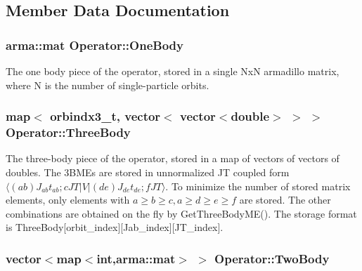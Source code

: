 \subsection{Member Data Documentation}
\hypertarget{classOperator_a14b1c78e0be45772aa57168c74d1b57c}{
\subsubsection[{One\-Body}]{\setlength{\rightskip}{0pt plus 5cm}arma\-::mat Operator\-::\-One\-Body}}\label{classOperator_a14b1c78e0be45772aa57168c74d1b57c}
The one body piece of the operator, stored in a single Nx\-N armadillo matrix, where N is the number of single-\/particle orbits. \hypertarget{classOperator_a74ea65bd21f8bd5aa8e67782a700c377}{
\subsubsection[{Three\-Body}]{\setlength{\rightskip}{0pt plus 5cm}map$<$ orbindx3\-\_\-t, vector$<$ vector$<$double$>$ $>$ $>$ Operator\-::\-Three\-Body}}\label{classOperator_a74ea65bd21f8bd5aa8e67782a700c377}
The three-\/body piece of the operator, stored in a map of vectors of vectors of doubles. The 3\-B\-M\-Es are stored in unnormalized J\-T coupled form $ \langle (ab)J_{ab}t_{ab};cJT | V | (de)J_{de}t_{de};f JT \rangle $. To minimize the number of stored matrix elements, only elements with $ a\geq b \geq c, a\geq d\geq e \geq f $ are stored. The other combinations are obtained on the fly by Get\-Three\-Body\-M\-E(). The storage format is Three\-Body\mbox{[}orbit\-\_\-index\mbox{]}\mbox{[}Jab\-\_\-index\mbox{]}\mbox{[}J\-T\-\_\-index\mbox{]}. \hypertarget{classOperator_a0778ed6b9b7b47e34f11fa187189c943}{
\subsubsection[{Two\-Body}]{\setlength{\rightskip}{0pt plus 5cm}vector$<$map$<$int,arma\-::mat$>$ $>$ Operator\-::\-Two\-Body}}\label{classOperator_a0778ed6b9b7b47e34f11fa187189c943}
